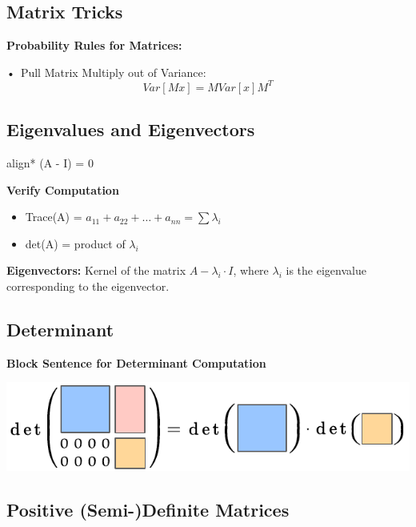 \documentclass[8pt, a4paper, landscape, includeheadfoot]{extarticle}
\begin{document}
\begin{multicols*}{4}
	\subsection{Matrix Tricks}

	\textbf{Probability Rules for Matrices:}

	• Pull Matrix Multiply out of Variance:
	$$
		Var[Mx] = MVar[x]M^T
	$$

	\subsection{Eigenvalues and Eigenvectors}

	\begin{empheq}[box = \mathboxnoback]{align*}
		 \det(A - \lambda\cdot I) = 0
	\end{empheq}

	\textbf{Verify Computation}

	\begin{itemize}[leftmargin=0.29cm, itemsep=0.5pt]
		\item Trace(A) = \( a_{11} + a_{22} + \dots + a_{nn} = \sum \lambda_i \)
		\item det(A) = product of \( \lambda_i \)
	\end{itemize}

	\textbf{Eigenvectors: } Kernel of the matrix $A - \lambda_i\cdot I$, where \( \lambda_i \) is the eigenvalue corresponding to the eigenvector.

	\subsection{Determinant}

	\textbf{Block Sentence for Determinant Computation}

	\begin{center}
		\includegraphics[width = 0.8 \columnwidth]{0_images/Blocksatz.pdf}
	\end{center}

	\subsection{Positive (Semi-)Definite Matrices}

\end{multicols*}
\end{document}
